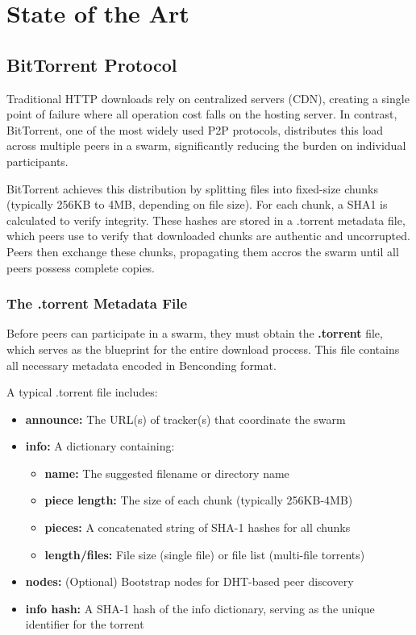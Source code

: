 \chapter{State of the Art}
\label{state-of-the-art}



\section{BitTorrent Protocol}
\label{BitTorrent}

Traditional HTTP downloads rely on centralized servers (CDN), creating a single point of failure where all operation cost falls on the hosting server. In contrast, BitTorrent, one of the most widely used P2P protocols, distributes this load across multiple peers in a swarm, significantly reducing the burden on individual participants.

BitTorrent achieves this distribution by splitting files into fixed-size chunks (typically 256KB to 4MB, depending on file size). For each chunk, a SHA1 is calculated to verify integrity. These hashes are stored in a .torrent metadata file, which peers use to verify that downloaded chunks are authentic and uncorrupted. Peers then exchange these chunks, propagating them accros the swarm until all peers possess complete copies.

\subsection{The .torrent Metadata File}
\label{torrent_file}
Before peers can participate in a swarm, they must obtain the \textbf{.torrent} file, which serves as the blueprint for the entire download process. This file contains all necessary metadata encoded in Benconding format.

A typical .torrent file includes:

\begin{itemize}
  \item \textbf{announce:} The URL(s) of tracker(s) that coordinate the swarm
  \item \textbf{info:} A dictionary containing:
    \begin{itemize}
      \item \textbf{name:} The suggested filename or directory name
      \item \textbf{piece length:} The size of each chunk (typically 256KB-4MB)
      \item \textbf{pieces:} A concatenated string of SHA-1 hashes for all chunks
      \item \textbf{length/files:} File size (single file) or file list (multi-file torrents)
    \end{itemize}
  \item \textbf{nodes:} (Optional) Bootstrap nodes for DHT-based peer discovery
  \item \textbf{info hash:} A SHA-1 hash of the info dictionary, serving as
    the unique identifier for the torrent
\end{itemize}

